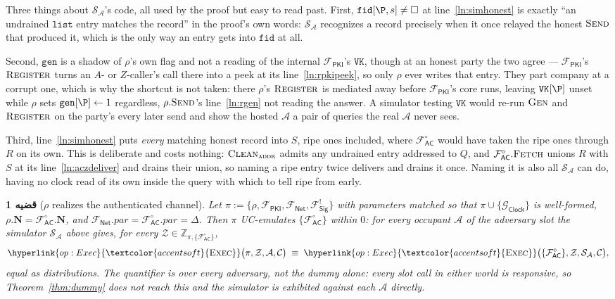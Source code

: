 \documentclass[10pt,oneside,openany]{book}
\newcommand{\admits}{\mathbf{N}}
\newcommand{\pars}{\mathit{par}}
\newcommand{\Corr}{\mathcal{C}}
\newcommand{\Zenv}{\mathcal{Z}}
\newcommand{\Adv}{\mathcal{A}}
\newcommand{\Sim}{\mathcal{S}}
\newcommand{\ZenvSet}{\mathbb{Z}}
\newcommand{\op}[1]{\textnormal{\textsc{#1}}}
\newcommand{\opl}[1]{\hyperlink{op:#1}{\textcolor{accentsoft}{\op{#1}}}}
\newcommand{\Fsig}{\mathcal{F}_{\mathsf{Sig}}}
\newcommand{\Gclock}{\mathcal{G}_{\mathsf{Clock}}}
\newcommand{\Fnet}{\mathcal{F}_{\mathsf{Net}}}
\newcommand{\Facz}{\mathcal{F}^{\circ}_{\mathsf{AC}}}
\newcommand{\Fpki}{\mathcal{F}_{\mathsf{PKI}}}
\newcommand{\unset}{\square}
\newcommand{\Clean}{\op{Clean}}
\newcommand{\V}[1]{\mathtt{#1}}
\theoremstyle{accentdef}
\theoremstyle{accentplain}
\newtheorem{theorem}[definition]{قضیه}
\begin{document}
Three things about $\Sim_{\Adv}$'s code, all used by the proof but easy to read past. First,
$\V{fid}[\P,s] \neq \unset$ at line~\ref{ln:simhonest} is exactly ``an undrained $\V{list}$ entry
matches the record'' in the proof's own words: $\Sim_{\Adv}$ recognizes a record precisely when it
once relayed the honest $\op{Send}$ that produced it, which is the only way an entry gets into
$\V{fid}$ at all.

Second, $\V{gen}$ is a shadow of $\rho$'s own flag and not a reading of the internal $\Fpki$'s
$\V{VK}$, though at an honest party the two agree --- $\Fpki$'s $\op{Register}$ turns an $A$- or
$Z$-caller's call there into a peek at its line~\ref{ln:rpkipeek}, so only $\rho$ ever writes that
entry. They part company at a corrupt one, which is why the shortcut is not taken: there $\rho$'s
$\op{Register}$ is mediated away before $\Fpki$'s core runs, leaving $\V{VK}[\P]$ unset while
$\rho$ sets $\V{gen}[\P] \gets 1$ regardless, $\rho.\op{Send}$'s line~\ref{ln:rgen} not reading
the answer. A simulator
testing $\V{VK}$ would re-run $\op{Gen}$ and $\op{Register}$ on the party's every later send and
show the hosted $\Adv$ a pair of queries the real $\Adv$ never sees.

Third, line~\ref{ln:simhonest} puts \emph{every} matching honest record into $S$, ripe ones
included, where $\Facz$ would have taken the ripe ones through $R$ on its own. This is deliberate
and costs nothing: $\Clean_{\op{addr}}$ admits any undrained entry addressed to $Q$, and
$\Facz.\op{Fetch}$ unions $R$ with $S$ at its line~\ref{ln:aczdeliver} and drains their union, so
naming a ripe entry twice delivers and drains it once. Naming it is also all $\Sim_{\Adv}$ can do, having no clock read of
its own inside the query with which to tell ripe from early.

\begin{theorem}[$\rho$ realizes the authenticated channel]\label{thm:realac}
Let $\pi := \{\rho,\Fpki,\Fnet,\Fsig^{!}\}$ with parameters matched so that $\pi \cup \{\Gclock\}$
is well-formed, $\rho.\admits = \Facz.\admits$, and $\Fnet.\pars = \Facz.\pars = \Delta$. Then
$\pi$ UC-emulates $\{\Facz\}$ within $0$: for every occupant $\Adv$ of the adversary slot the
simulator $\Sim_{\Adv}$ above gives, for every $\Zenv \in \ZenvSet_{\pi,\{\Facz\}}$,
\[
  \opl{Exec}\bigl(\pi,\Zenv,\Adv,\Corr\bigr)
  \;\equiv\;
  \opl{Exec}\bigl(\{\Facz\},\Zenv,\Sim_{\Adv},\Corr\bigr) ,
\]
equal as distributions. The quantifier is over \emph{every} adversary, not the dummy alone: every
slot call in either world is responsive, so Theorem~\ref{thm:dummy} does not reach this and the
simulator is exhibited against each $\Adv$ directly.
\end{theorem}
\end{document}
